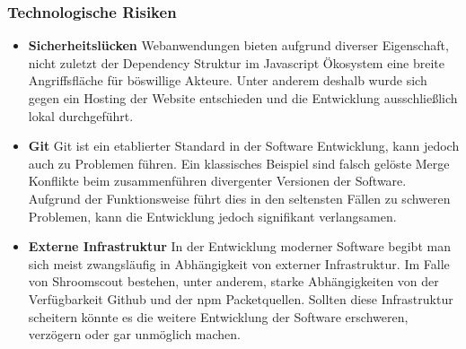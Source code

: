\documentclass[../main.tex]{subfiles} %
\begin{document}
\subsubsection{Technologische Risiken} %

\begin{itemize}

	\item \textbf{Sicherheitslücken}
		Webanwendungen bieten aufgrund diverser Eigenschaft, nicht zuletzt der Dependency Struktur im Javascript Ökosystem
		eine breite Angriffsfläche für böswillige Akteure. Unter anderem deshalb wurde sich gegen ein Hosting der Website entschieden
		und die Entwicklung ausschließlich lokal durchgeführt.
	\item \textbf{Git}
		Git ist ein etablierter Standard in der Software Entwicklung, kann jedoch auch zu Problemen führen.
		Ein klassisches Beispiel sind falsch gelöste Merge Konflikte beim zusammenführen divergenter Versionen der Software.
		Aufgrund der Funktionsweise führt dies in den seltensten Fällen zu schweren Problemen, kann die Entwicklung jedoch 
		signifikant verlangsamen.
	\item \textbf{Externe Infrastruktur}
		In der Entwicklung moderner Software begibt man sich meist zwangsläufig in Abhängigkeit von externer Infrastruktur.
		Im Falle von Shroomscout bestehen, unter anderem, starke Abhängigkeiten von der Verfügbarkeit Github und der npm Packetquellen.
		Sollten diese Infrastruktur scheitern könnte es die weitere Entwicklung der Software erschweren, verzögern oder gar unmöglich machen.

\end{itemize}
\end{document}
